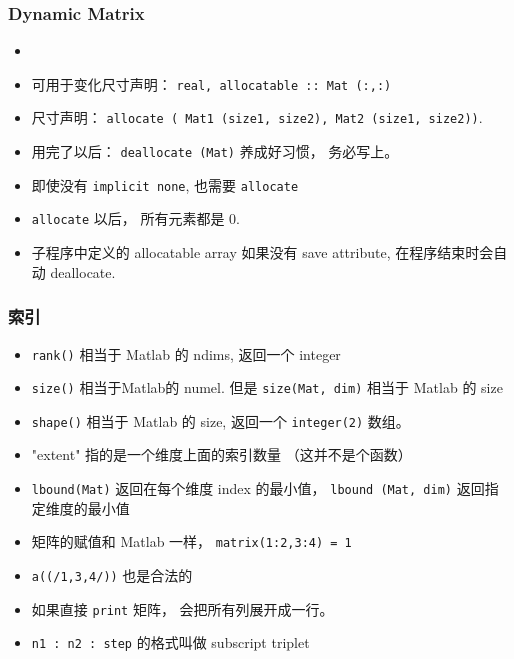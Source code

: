 \subsubsection{Dynamic Matrix}
\begin{itemize}
\item \item 可用于变化尺寸声明： \verb`real, allocatable :: Mat (:,:)`
\item 尺寸声明： \verb`allocate ( Mat1 (size1, size2), Mat2 (size1, size2))`.
\item 用完了以后： \verb`deallocate (Mat)` 养成好习惯， 务必写上。
\item 即使没有 \verb`implicit none`, 也需要 \verb`allocate`
\item \verb|allocate| 以后， 所有元素都是 0.
\item 子程序中定义的 allocatable array 如果没有 save attribute, 在程序结束时会自动 deallocate.
\end{itemize}

\subsubsection{索引}
\begin{itemize}
\item \verb`rank()` 相当于 Matlab 的 ndims, 返回一个 integer
\item \verb`size()` 相当于Matlab的 numel. 但是 \verb`size(Mat, dim)` 相当于 Matlab 的 size
\item \verb`shape()` 相当于 Matlab 的 size, 返回一个 \verb`integer(2)` 数组。
\item "extent" 指的是一个维度上面的索引数量 （这并不是个函数）
\item \verb`lbound(Mat)` 返回在每个维度 index 的最小值， \verb`lbound (Mat, dim)` 返回指定维度的最小值
\item 矩阵的赋值和 Matlab 一样， \verb`matrix(1:2,3:4) = 1`
\item \verb`a((/1,3,4/))` 也是合法的
\item 如果直接 \verb`print` 矩阵， 会把所有列展开成一行。
\item \verb`n1 : n2 : step` 的格式叫做 subscript triplet
\end{itemize}

